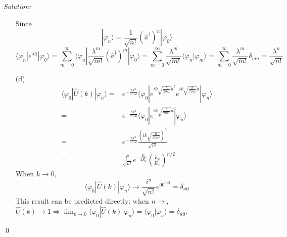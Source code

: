 \documentclass[12pt,a4paper]{article}
\newenvironment{sol}
    {\emph{Solution:}
    }
    {
    \qed
    }
\begin{document}
\begin{sol}
\begin{itemize}
\begin{equation}
\end{equation}
Since
\begin{equation}
|\varphi_n\rangle=\frac{1}{\sqrt{n!}}(\hat{a}^{\dagger})^n|\varphi_0\rangle
\end{equation}
\begin{equation}
\langle\varphi_n|e^{\lambda\hat{a}}|\varphi_0\rangle=\sum_{m=0}^{\infty}\langle\varphi_n|\frac{\lambda^m}{\sqrt{m!}}(\hat{a}^{\dagger})^m|\varphi_0\rangle=\sum_{m=0}^{\infty}\frac{\lambda^m}{\sqrt{m!}}\langle\varphi_n|\varphi_m\rangle=\sum_{m=0}^{\infty}\frac{\lambda^m}{\sqrt{m!}}\delta_{mn}=\frac{\lambda^n}{\sqrt{n!}}
\end{equation}
\item[(d)]
\begin{align}
\nonumber\langle\varphi_0|\hat{U}(k)|\varphi_n\rangle=&e^{-\frac{\hbar k^2}{4m\omega}}\langle\varphi_0|e^{ik\sqrt{\frac{\hbar}{2m\omega}}\hat{a}^{\dagger}}e^{ik\sqrt{\frac{\hbar}{2m\omega}}\hat{a}}|\varphi_n\rangle\\
\nonumber=&e^{-\frac{\hbar k^2}{4m\omega}}\langle\varphi_0|e^{ik\sqrt{\frac{\hbar}{2m\omega}}\hat{a}}|\varphi_n\rangle\\
\nonumber=&e^{-\frac{\hbar k^2}{4m\omega}}\frac{\left(ik\sqrt{\frac{\hbar}{2m\omega}}\right)^n}{\sqrt{n!}}\\
=&\frac{i^n}{\sqrt{n!}}e^{-\frac{E_k}{2E_{\omega}}}\left(\frac{E_k}{E_{\omega}}\right)^{n/2}
\end{align}
When $k\rightarrow0$,
\begin{equation}
\langle\varphi_0|\hat{U}(k)|\varphi_n\rangle\rightarrow\frac{i^n}{\sqrt{n!}}e^00^{n/2}=\delta_{n0}
\end{equation}
This result can be predicted directly: when $n\rightarrow$, $\hat{U}(k)\rightarrow1\Longrightarrow\lim_{k\rightarrow0}\langle\varphi_0|\hat{U}(k)|\varphi_n\rangle=\langle\varphi_0|\varphi_n\rangle=\delta_{n0}$.
\end{itemize}
\end{sol}
\end{document}
